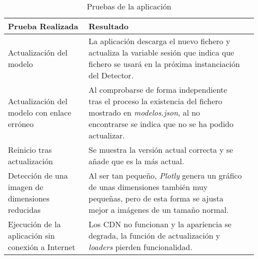 \begin{table}[h]
	\begin{center}
		\begin{tabular}{>{\centering\arraybackslash}m{5cm} >{\centering\arraybackslash}m{5cm} p{9cm}}
		    \hline
			\textbf{Prueba Realizada}  & \textbf{Resultado}\\ \hline \hline
			    	Actualización del modelo & La aplicación descarga el nuevo fichero y actualiza la variable sesión que indica que fichero se usará en la próxima instanciación del Detector. \\ \hline
        			Actualización del modelo con enlace erróneo & Al comprobarse de forma independiente tras el proceso la existencia del fichero mostrado en \emph{modelos.json}, al no encontrarse se indica que no se ha podido actualizar. \\ \hline
        			Reinicio tras actualización & Se muestra la versión actual correcta y se añade que es la más actual. \\ \hline
        			Detección de una imagen de dimensiones reducidas & Al ser tan pequeño, \emph{Plotly} genera un gráfico de unas dimensiones también muy pequeñas, pero de esta forma se ajusta mejor a imágenes de un tamaño normal. \\ \hline
        			Ejecución de la aplicación sin conexión a Internet & Los CDN no funcionan y la apariencia se degrada, la función de actualización y \emph{loaders} pierden funcionalidad. \\ \hline

    			    
		\end{tabular}
		\caption{Pruebas de la aplicación}
		\label{tablapruebas2}
	\end{center}
\end{table}